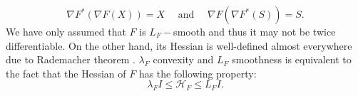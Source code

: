 \begin{equation}
\nabla F^* ( \nabla F (X)) = X \quad \mbox{ and } \quad \nabla F (\nabla F^*(S)) = S.
\end{equation}
%
%
%
%
We have only assumed that $F$ is $L_F-$smooth and thus it may not be twice differentiable. On the other hand, its Hessian is well-defined almost everywhere due to Rademacher theorem \cite{o2006metric}. $\lambda_F$ convexity and $L_F$ smoothness is equivalent to the fact that the Hessian of $F$ has the following property: 
\begin{equation}
\lambda_F I \leq \mathcal{H}_F \leq L_F I.  
\end{equation}
